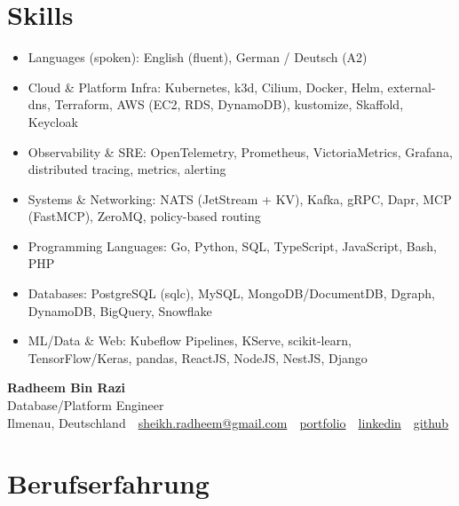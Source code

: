 \documentclass[10pt,a4paper]{resume}
\makeatletter
\newcommand{\Portfolio}{https://radheem.github.io/my-cv}
\newcommand{\PortfolioText}{portfolio}
\newcommand{\GitHub}{https://github.com/radheem}
\newcommand{\LinkedIn}{https://www.linkedin.com/in/radheem-razi}
\newcommand{\Email}{sheikh.radheem@gmail.com}
\makeatother
\begin{document}
\section{Skills}

\begin{itemize}[leftmargin=1.4em,nosep,topsep=2pt]
  \item Languages (spoken): English (fluent), German / Deutsch (A2)
  \item Cloud \& Platform Infra: Kubernetes, k3d, Cilium, Docker, Helm, external-dns, Terraform, AWS (EC2, RDS, DynamoDB), kustomize, Skaffold, Keycloak
  \item Observability \& SRE: OpenTelemetry, Prometheus, VictoriaMetrics, Grafana, distributed tracing, metrics, alerting
  \item Systems \& Networking: NATS (JetStream + KV), Kafka, gRPC, Dapr, MCP (FastMCP), ZeroMQ, policy-based routing
  \item Programming Languages: Go, Python, SQL, TypeScript, JavaScript, Bash, PHP
  \item Databases: PostgreSQL (sqlc), MySQL, MongoDB/DocumentDB, Dgraph, DynamoDB, BigQuery, Snowflake
  \item ML/Data \& Web: Kubeflow Pipelines, KServe, scikit-learn, TensorFlow/Keras, pandas, ReactJS, NodeJS, NestJS, Django
\end{itemize}

\clearpage
{}

\begin{center}
  {\huge\bfseries Radheem Bin Razi}\\[3pt]
  {\large Database/Platform Engineer}\\[6pt]
  \small
  Ilmenau, Deutschland \,\textbar\,
  \href{mailto:\Email}{\Email} \,\textbar\,
  \href{\Portfolio}{\PortfolioText} \,\textbar\,
  \href{\LinkedIn}{linkedin} \,\textbar\,
  \href{\GitHub}{github}
\end{center}
\vspace{2pt}

\section{Berufserfahrung}
\end{document}
